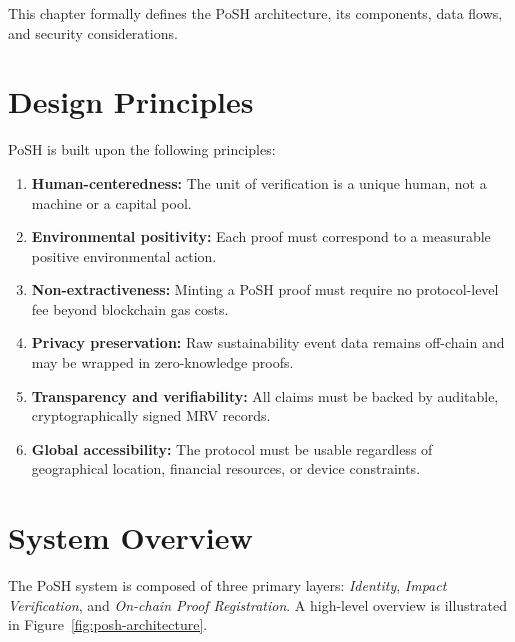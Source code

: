 \documentclass[11pt,a4paper]{report}
\theoremstyle{definition}
\theoremstyle{remark}
\begin{document}
This chapter formally defines the PoSH architecture, its components, data flows,
and security considerations.

\section{Design Principles}

PoSH is built upon the following principles:

\begin{enumerate}[label=\arabic*.,leftmargin=*]
    \item \textbf{Human-centeredness:} The unit of verification is a unique human,
    not a machine or a capital pool.
    \item \textbf{Environmental positivity:} Each proof must correspond to a
    measurable positive environmental action.
    \item \textbf{Non-extractiveness:} Minting a PoSH proof must require no
    protocol-level fee beyond blockchain gas costs.
    \item \textbf{Privacy preservation:} Raw sustainability event data remains
    off-chain and may be wrapped in zero-knowledge proofs.
    \item \textbf{Transparency and verifiability:} All claims must be backed by
    auditable, cryptographically signed MRV records.
    \item \textbf{Global accessibility:} The protocol must be usable regardless
    of geographical location, financial resources, or device constraints.
\end{enumerate}

\section{System Overview}

The PoSH system is composed of three primary layers:
\emph{Identity}, \emph{Impact Verification}, and \emph{On-chain Proof
Registration}. A high-level overview is illustrated in
Figure~\ref{fig:posh-architecture}.
\end{document}
